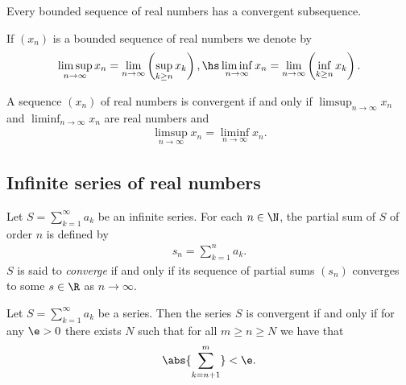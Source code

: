 \documentclass{article}
\begin{document}
\begin{theorem}
    Every bounded sequence of real numbers has a convergent subsequence. 
\end{theorem}

\begin{definition}[Notes 1.5]
    If $(x_n)$ is a bounded sequence of real numbers we denote by
    \begin{align*}
        \limsup_{n\to\infty} x_n = \lim_{n\to\infty}\left(\sup_{k\geq n}x_k\right),\hs
        \liminf_{n\to\infty} x_n = \lim_{n\to\infty}\left(\inf_{k\geq n}x_k\right).
    \end{align*} 
\end{definition}

\begin{theorem}[Notes 1.6]
    A sequence $(x_n)$ of real numbers is convergent if and only if $\limsup_{n\to\infty}x_n$
    and $\liminf_{n\to\infty}x_n$ are real numbers and
    \begin{align*}
        \limsup_{n\to\infty}x_n =\liminf_{n\to\infty} x_n.
    \end{align*}
\end{theorem}

\subsection{Infinite series of real numbers}

\begin{definition}[Notes 1.6]
    Let $S=\sum_{k=1}^\infty a_k$ be an infinite series. For each $n\in\N$, the partial
    sum of $S$ of order $n$ is defined by
    \begin{align*}
        s_n = \sum_{k=1}^n a_k. 
    \end{align*} 
    $S$ is said to \emph{converge} if and only if its sequence of partial sums $(s_n)$
    converges to some $s\in\R$ as $n\to\infty$.
\end{definition}

\begin{theorem}
    Let $S=\sum_{k=1}^\infty a_k$ be a series. Then the series $S$ is convergent
    if and only if for any $\e>0$ there exists $N$ such that for all $m\geq n\geq N$
    we have that
    \begin{align*}
        \abs{\sum_{k=n+1}^m}<\e.
    \end{align*} 
\end{theorem}
\end{document}
